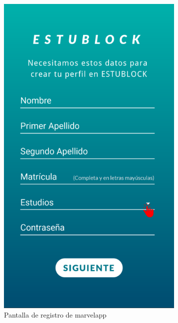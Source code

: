 \begin{figure}[hbt]
	\centering
	\begin{subfigure}[b]{0.4\linewidth}
		\centering
        \includegraphics[width=0.7\linewidth]{figs/Desarrollo/Interfaz/marvel_registro}
        \caption[Marvel Registro]{Pantalla de registro de marvelapp}
	\end{subfigure} 
	\begin{subfigure}[b]{0.4\linewidth}
		\centering

\end{subfigure}
\end{figure}
